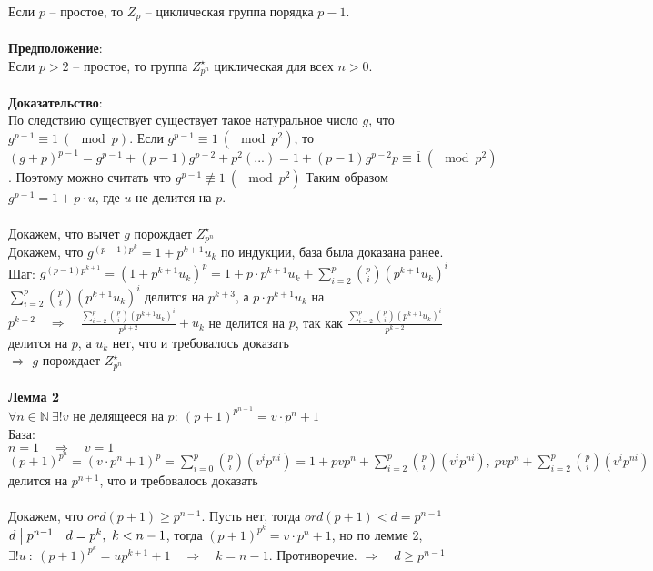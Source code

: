 		Если $p$ -- простое, то $Z_p$ -- циклическая группа порядка $p - 1$.\\
		\\
		\textbf{Предположение}:\\
		Если $p > 2$ -- простое, то группа $Z^{\star}_{p^n}$ циклическая для всех $n > 0$.\\
		\\
		\textbf{Доказательство}:\\
		По следствию существует существует такое натуральное число $g$, что $g^{p - 1} \equiv 1 \ (\mod p)$. Если $g^{p-1} \equiv 1 \ (\mod p^2)$, то $(g + p)^{p-1} = g^{p - 1} + (p - 1)g^{p - 2} + p^2(...) = 1 + (p - 1)g^{p - 2}p \equiv \overline{1} \ (\mod p^2)$. Поэтому можно считать что $g^{p - 1} \not\equiv 1 \ (\mod p^2)$ Таким образом $g^{p - 1} = 1 + p \cdot u$, где $u$ не делится на $p$.\\
		\\
		Докажем, что вычет $g$ порождает $Z^{\star}_{p^n}$\\
		Докажем, что $g^{(p-1)p^k} = 1 + p^{k+1}u_k$ по индукции, база была доказана ранее.\\
		Шаг: $g^{(p-1)p^{k+1}} = (1 + p^{k+1}u_k)^p = 1 + p \cdot p^{k+1}u_k + \sum^p_{i = 2} {p \choose i} (p^{k+1}u_k)^i$\\
		$\sum^p_{i = 2} {p \choose i} (p^{k+1}u_k)^i$ делится на $p^{k+3}$, а $ p \cdot p^{k+1}u_k$ на $p^{k+2} \quad \Rightarrow \quad \frac{\sum^p_{i = 2} {p \choose i} (p^{k+1}u_k)^i}{p^{k+2}} + u_k$ не делится на $p$, так как $\frac{\sum^p_{i = 2} {p \choose i} (p^{k+1}u_k)^i}{p^{k+2}}$ делится на $p$, а $u_k$ нет, что и требовалось доказать\\
		$\Rightarrow$ $g$ порождает $Z^{\star}_{p^n}$\\
		\\
		\textbf{Лемма 2}\\
		$\forall n \in \mathbb{N} \ \exists ! v$ не делящееся на $p:\ (p + 1)^{p^{n - 1}} = v \cdot p^n + 1$\\
		База:\\
		$n = 1 \quad \Rightarrow \quad v = 1$\\
		$(p + 1)^{p^n} = (v \cdot p^n + 1)^p = \sum^p_{i = 0} {p \choose i} (v^i p^{ni}) = 1 + pvp^n + \sum^p_{i = 2} {p \choose i} (v^i p^{ni}),\ pvp^n + \sum^p_{i = 2} {p \choose i} (v^i p^{ni})$ делится на $p^{n+1}$, что и требовалось доказать\\
		\\
		Докажем, что $ord(p + 1) \geq p^{n - 1}$. Пусть нет, тогда $ord(p + 1) < d = p^{n - 1}$ $d \bigm| p^{n - 1} \quad d = p^k,\ k < n - 1$, тогда $(p + 1)^{p^k} = v \cdot p^n + 1$, но по лемме 2, $\exists! u \: : \: (p + 1)^{p^k} = up^{k + 1} + 1 \quad \Rightarrow \quad k = n - 1$. Противоречие. $\Rightarrow \quad d \geq p^{n - 1}$\\
